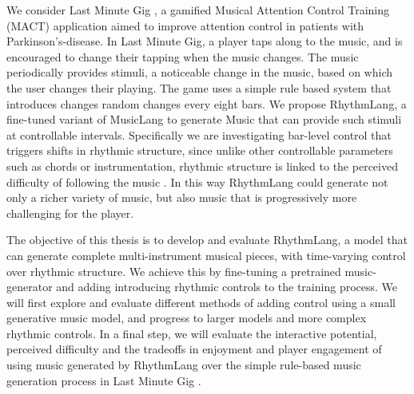 We consider Last Minute Gig \cite{Chalkiadakis_2022}, a gamified Musical Attention Control Training (MACT) application aimed to improve attention control in patients with Parkinson's-disease. In Last Minute Gig, a player taps along to the music, and is encouraged to change their tapping when the music changes. The music periodically provides stimuli, a noticeable change in the music, based on which the user changes their playing. The game uses a simple rule based system that introduces changes random changes every eight bars. We propose RhythmLang, a fine-tuned variant of MusicLang to generate Music that can provide such stimuli at controllable intervals. Specifically we are investigating bar-level control that triggers shifts in rhythmic structure, since unlike other controllable parameters such as chords or instrumentation, rhythmic structure is linked to the perceived difficulty of following the music \cite{Volk2008Syncopation}. In this way RhythmLang could generate not only a richer variety of music, but also music that is progressively more challenging for the player.   

The objective of this thesis is to develop and evaluate RhythmLang, a model that can generate complete multi-instrument musical pieces, with time-varying control over rhythmic structure. We achieve this by fine-tuning a pretrained music-generator and adding introducing rhythmic controls to the training process. We will first explore and evaluate different methods of adding control using a small generative music model, and progress to larger models and more complex rhythmic controls. In a final step, we will evaluate the interactive potential, perceived difficulty and the tradeoffs in enjoyment and player engagement of using music generated by RhythmLang over the simple rule-based music generation process in Last Minute Gig \cite{Chalkiadakis_2022}.

